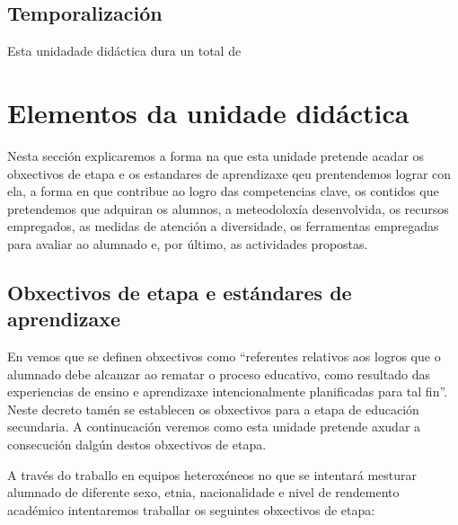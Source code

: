 \subsection{Temporalización}
Esta unidadade didáctica dura un total de


\section{Elementos da unidade didáctica}
Nesta sección explicaremos a forma na que esta unidade pretende acadar os obxectivos de etapa e os estandares de aprendizaxe qeu prentendemos lograr con ela, a forma en que contribue ao logro das competencias clave, os contidos que pretendemos que adquiran os alumnos, a meteodoloxía desenvolvida, os recursos empregados, as medidas de atención a diversidade, os ferramentas empregadas para avaliar ao alumnado e, por último, as actividades propostas.

\subsection{Obxectivos de etapa e estándares de aprendizaxe}

En \cite{dogcurrlomce} vemos que se definen obxectivos como ``referentes relativos aos logros que o alumnado debe alcanzar ao rematar o proceso educativo, como resultado das experiencias de ensino e aprendizaxe intencionalmente planificadas para tal fin''. Neste decreto tamén se establecen os obxectivos para a etapa de educación secundaria. A continucación veremos como esta unidade pretende axudar a consecución dalgún destos obxectivos de etapa.

A través do traballo en equipos heteroxéneos no que se intentará mesturar alumnado de diferente sexo, etnia, nacionalidade e nivel de rendemento académico intentaremos traballar os seguintes obxectivos de etapa:

